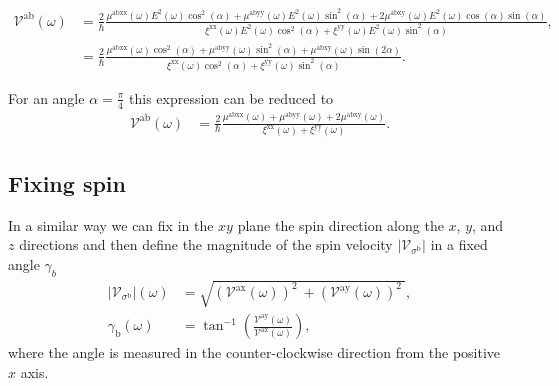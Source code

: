 \documentclass[prb,11pt,tightenlines,twocolumn,aps]{revtex4-1}
\begin{document}
\begin{widetext}
\begin{align}
\mathcal{V}^{\mathrm{ab}} (\omega) 
&= \frac{2}{\hbar}
\frac{\mu^{\mathrm{abxx}}(\omega)
E^{2}(\omega)\cos^{2}(\alpha) + 
\mu^{\mathrm{abyy}}(\omega)
E^{2}(\omega)\sin^{2}(\alpha) + 
2\mu^{\mathrm{abxy}}(\omega)
E^{2}(\omega)\cos(\alpha)\sin(\alpha)}
{\xi^{\mathrm{xx}}(\omega)
E^{2}(\omega)\cos^{2}(\alpha) + 
\xi^{\mathrm{yy}}(\omega)
E^{2}(\omega)\sin^{2}(\alpha)},
\nonumber \\
&= \frac{2}{\hbar}
\frac{\mu^{\mathrm{abxx}}(\omega)\cos^{2}(\alpha) + 
\mu^{\mathrm{abyy}}(\omega)\sin^{2}(\alpha) + 
\mu^{\mathrm{abxy}}(\omega)\sin(2\alpha)}
{\xi^{\mathrm{xx}}(\omega)\cos^{2}(\alpha) + 
\xi^{\mathrm{yy}}(\omega)\sin^{2}(\alpha)}.
\label{eq:vab}
\end{align}
\end{widetext}

For an angle $\alpha = \frac{\pi}{4}$ this expression can be reduced to 
\begin{align}
\mathcal{V}^{\mathrm{ab}} (\omega)
&= \frac{2}{\hbar}
\frac{\mu^{\mathrm{abxx}}(\omega) + \mu^{\mathrm{abyy}}(\omega) + 
2\mu^{\mathrm{abxy}}(\omega)}
{\xi^{\mathrm{xx}}(\omega) + \xi^{\mathrm{yy}}(\omega)}.
\label{eq:vab-90deg}
\end{align}


\subsection{Fixing spin}\label{sec:theory-fixspin}
In a similar way we can fix in the $xy$ plane the spin direction along the $x$,
$y$, and $z$ directions and then define the magnitude of the spin velocity $|\mathcal{V}_{\sigma^{\mathrm{b}}}|$ in a fixed angle $\gamma_{b}$
\begin{align}
|\mathcal{V}_{\sigma^{\mathrm{b}}}| (\omega)
&=
\sqrt{
(\mathcal{V}^{\mathrm{ax}}(\omega))^{2}\ +
(\mathcal{V}^{\mathrm{ay}}(\omega))^{2}\ 
}, 
\label{eq:vs-mag}
\\
\gamma_{\mathrm{b}} (\omega)
&=
\tan^{-1} \left( \frac{\mathcal{V}^{\mathrm{ay}}(\omega)}
{\mathcal{V}^{\mathrm{ax}}(\omega)} \right),
\label{eq:gamma-ang}
\end{align}
where the angle is measured in the counter-clockwise direction from the positive
$x$ axis.
\end{document}
